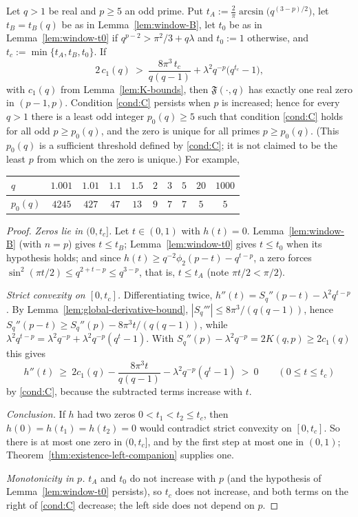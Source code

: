 \begin{theorem}\label{thm:uniq-explicit}
Let $q>1$ be real and $p\ge5$ an odd prime. Put $t_A:=\frac2\pi\arcsin\!\bigl(q^{(3-p)/2}\bigr)$, let $t_B=t_B(q)$ be as in Lemma~\ref{lem:window-B}, let $t_0$ be as in Lemma~\ref{lem:window-t0} if $q^{p-2}>\pi^2/3+q\lambda$ and $t_0:=1$ otherwise, and $t_c:=\min\{t_A,t_B,t_0\}$. If
\begin{equation}\tag{C}\label{cond:C}
2\,c_1(q)\ >\ \frac{8\pi^3\,t_c}{q(q-1)}+\lambda^2q^{-p}\bigl(q^{t_c}-1\bigr),
\end{equation}
with $c_1(q)$ from Lemma~\ref{lem:K-bounds}, then $\mathfrak F(\cdot,q)$ has exactly one real zero in $(p-1,p)$. Condition \eqref{cond:C} persists when $p$ is increased; hence for every $q>1$ there is a least odd integer $p_0(q)\ge5$ such that condition \eqref{cond:C} holds for all odd $p\ge p_0(q)$, and the zero is unique for all primes $p\ge p_0(q)$. (This $p_0(q)$ is a sufficient threshold defined by \eqref{cond:C}; it is not claimed to be the least $p$ from which on the zero is unique.) For example,
\begin{center}
\begin{tabular}{@{}l|ccccccccc@{}}
$q$ & $1.001$ & $1.01$ & $1.1$ & $1.5$ & $2$ & $3$ & $5$ & $20$ & $1000$\\
\hline
$p_0(q)$ & $4245$ & $427$ & $47$ & $13$ & $9$ & $7$ & $7$ & $5$ & $5$
\end{tabular}
\end{center}
\end{theorem}
\begin{proof}
\emph{Zeros lie in $(0,t_c]$.} Let $t\in(0,1)$ with $h(t)=0$. Lemma~\ref{lem:window-B} (with $n=p$) gives $t\le t_B$; Lemma~\ref{lem:window-t0} gives $t\le t_0$ when its hypothesis holds; and since $h(t)\ge q^{-2}\phi_2(p-t)-q^{t-p}$, a zero forces $\sin^2(\pi t/2)\le q^{2+t-p}\le q^{3-p}$, that is, $t\le t_A$ (note $\pi t/2<\pi/2$).

\emph{Strict convexity on $[0,t_c]$.} Differentiating twice, $h''(t)=S_q''(p-t)-\lambda^2q^{t-p}$. By Lemma~\ref{lem:global-derivative-bound}, $|S_q'''|\le8\pi^3/(q(q-1))$, hence $S_q''(p-t)\ge S_q''(p)-8\pi^3t/(q(q-1))$, while $\lambda^2q^{t-p}=\lambda^2q^{-p}+\lambda^2q^{-p}(q^t-1)$. With $S_q''(p)-\lambda^2q^{-p}=2K(q,p)\ge2c_1(q)$ this gives
\[
h''(t)\ \ge\ 2c_1(q)-\frac{8\pi^3t}{q(q-1)}-\lambda^2q^{-p}(q^t-1)\ >\ 0\qquad(0\le t\le t_c)
\]
by \eqref{cond:C}, because the subtracted terms increase with $t$.

\emph{Conclusion.} If $h$ had two zeros $0<t_1<t_2\le t_c$, then $h(0)=h(t_1)=h(t_2)=0$ would contradict strict convexity on $[0,t_c]$. So there is at most one zero in $(0,t_c]$, and by the first step at most one in $(0,1)$; Theorem~\ref{thm:existence-left-companion} supplies one.

\emph{Monotonicity in $p$.} $t_A$ and $t_0$ do not increase with $p$ (and the hypothesis of Lemma~\ref{lem:window-t0} persists), so $t_c$ does not increase, and both terms on the right of \eqref{cond:C} decrease; the left side does not depend on $p$.
\end{proof}

